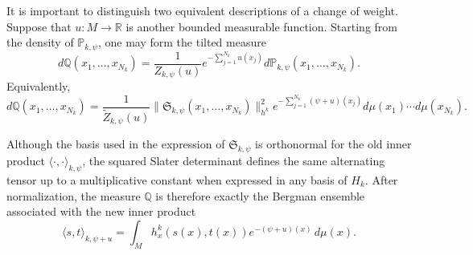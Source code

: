\documentclass[12pt,a4paper,reqno]{article}
\theoremstyle{thmstyleone}
\theoremstyle{thmstylethree}
\theoremstyle{thmstyletwo}
\numberwithin{equation}{subsection}
\def\leq{\leqslant}
\begin{document}



It is important to distinguish two equivalent descriptions of a change of weight. Suppose that $u:M\to\mathbb R$ is another bounded measurable function. Starting from the density of $\mathbb P_{k,\psi}$, one may form the tilted measure
\[
    d\mathbb Q(x_1,\ldots,x_{N_k})
    =
    \frac{1}{Z_{k,\psi}(u)}
    e^{-\sum_{j=1}^{N_k}u(x_j)}
    d\mathbb P_{k,\psi}(x_1,\ldots,x_{N_k}).
\]
Equivalently,
\[
    d\mathbb Q(x_1,\ldots,x_{N_k})
    =
    \frac{1}{\widetilde Z_{k,\psi}(u)}
    \big\|
        \mathfrak S_{k,\psi}(x_1,\ldots,x_{N_k})
    \big\|_{h^k}^{2}
    e^{-\sum_{j=1}^{N_k}(\psi+u)(x_j)}
    d\mu(x_1)\cdots d\mu(x_{N_k}).
\]

Although the basis used in the expression of $\mathfrak S_{k,\psi}$ is orthonormal for the old inner product $\langle\cdot,\cdot\rangle_{k,\psi}$, the squared Slater determinant defines the same alternating tensor up to a multiplicative constant when expressed in any basis of $H_k$. After normalization, the measure $\mathbb Q$ is therefore exactly the Bergman ensemble associated with the new inner product
\[
    \langle s,t\rangle_{k,\psi+u}
    =
    \int_M h_x^k(s(x),t(x))e^{-(\psi+u)(x)}\,d\mu(x).
\]
\end{document}
